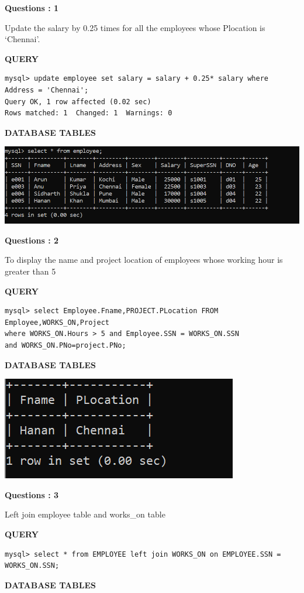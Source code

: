 \documentclass[a4paper,12pt]{report}
\begin{document}
\begin{flushleft}
    \textbf{Questions : 1}
\end{flushleft}
Update the salary by 0.25 times for all the employees whose Plocation is ‘Chennai’.
	\begin{flushleft}
		\textbf{QUERY }
	\end{flushleft}
 \begin{verbatim}
mysql> update employee set salary = salary + 0.25* salary where Address = 'Chennai';
Query OK, 1 row affected (0.02 sec)
Rows matched: 1  Changed: 1  Warnings: 0
\end{verbatim}
\begin{flushleft}
		\textbf{DATABASE TABLES} 
\end{flushleft} 

\includegraphics[scale=0.9]{updsal.png}
\begin{flushleft}
    \textbf{Questions : 2}
\end{flushleft}

To display the name and project location of employees whose working hour is greater than 5
	\begin{flushleft}
		\textbf{QUERY }
	\end{flushleft}
 \begin{verbatim}
mysql> select Employee.Fname,PROJECT.PLocation FROM Employee,WORKS_ON,Project 
where WORKS_ON.Hours > 5 and Employee.SSN = WORKS_ON.SSN 
and WORKS_ON.PNo=project.PNo;
 \end{verbatim}
\begin{flushleft}
		\textbf{DATABASE TABLES} 
\end{flushleft} 
\includegraphics[scale=1]{join.png}
\begin{flushleft}
    \textbf{Questions : 3}
\end{flushleft}
Left join employee table and works\_on table
	\begin{flushleft}
		\textbf{QUERY }
	\end{flushleft}
 \begin{verbatim}
mysql> select * from EMPLOYEE left join WORKS_ON on EMPLOYEE.SSN = WORKS_ON.SSN;
 \end{verbatim}
\begin{flushleft}
		\textbf{DATABASE TABLES} 
\end{flushleft} 
\end{document}
